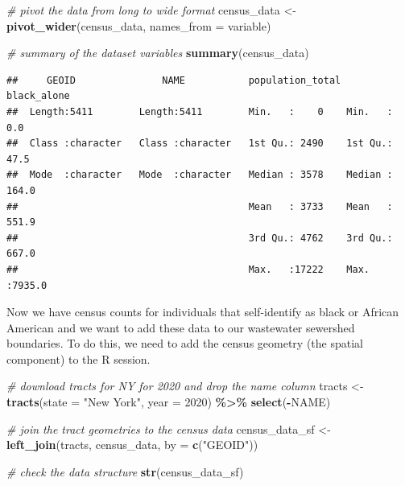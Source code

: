 \documentclass[
]{book}
\newenvironment{Shaded}{\begin{snugshade}}{\end{snugshade}}
\newcommand{\AttributeTok}[1]{\textcolor[rgb]{0.13,0.29,0.53}{#1}}
\newcommand{\CommentTok}[1]{\textcolor[rgb]{0.56,0.35,0.01}{\textit{#1}}}
\newcommand{\DecValTok}[1]{\textcolor[rgb]{0.00,0.00,0.81}{#1}}
\newcommand{\FunctionTok}[1]{\textcolor[rgb]{0.13,0.29,0.53}{\textbf{#1}}}
\newcommand{\NormalTok}[1]{#1}
\newcommand{\OtherTok}[1]{\textcolor[rgb]{0.56,0.35,0.01}{#1}}
\newcommand{\SpecialCharTok}[1]{\textcolor[rgb]{0.81,0.36,0.00}{\textbf{#1}}}
\newcommand{\StringTok}[1]{\textcolor[rgb]{0.31,0.60,0.02}{#1}}
\begin{document}
\begin{Shaded}
\begin{Highlighting}[]
\CommentTok{\# pivot the data from long to wide format}
\NormalTok{census\_data }\OtherTok{\textless{}{-}} \FunctionTok{pivot\_wider}\NormalTok{(census\_data,}
                           \AttributeTok{names\_from =}\NormalTok{ variable)}

\CommentTok{\# summary of the dataset variables}
\FunctionTok{summary}\NormalTok{(census\_data)}
\end{Highlighting}
\end{Shaded}

\begin{verbatim}
##     GEOID               NAME           population_total  black_alone    
##  Length:5411        Length:5411        Min.   :    0    Min.   :   0.0  
##  Class :character   Class :character   1st Qu.: 2490    1st Qu.:  47.5  
##  Mode  :character   Mode  :character   Median : 3578    Median : 164.0  
##                                        Mean   : 3733    Mean   : 551.9  
##                                        3rd Qu.: 4762    3rd Qu.: 667.0  
##                                        Max.   :17222    Max.   :7935.0
\end{verbatim}

Now we have census counts for individuals that self-identify as black or African American and we want to add these data to our wastewater sewershed boundaries. To do this, we need to add the census geometry (the spatial component) to the R session.

\begin{Shaded}
\begin{Highlighting}[]
\CommentTok{\# download tracts for NY for 2020 and drop the name column}
\NormalTok{tracts }\OtherTok{\textless{}{-}} \FunctionTok{tracts}\NormalTok{(}\AttributeTok{state =} \StringTok{"New York"}\NormalTok{, }\AttributeTok{year =} \DecValTok{2020}\NormalTok{) }\SpecialCharTok{\%\textgreater{}\%} \FunctionTok{select}\NormalTok{(}\SpecialCharTok{{-}}\NormalTok{NAME) }

\CommentTok{\# join the tract geometries to the census data}
\NormalTok{census\_data\_sf }\OtherTok{\textless{}{-}} \FunctionTok{left\_join}\NormalTok{(tracts, census\_data, }\AttributeTok{by =} \FunctionTok{c}\NormalTok{(}\StringTok{"GEOID"}\NormalTok{))}
\end{Highlighting}
\end{Shaded}

\begin{Shaded}
\begin{Highlighting}[]
\CommentTok{\# check the data structure}
\FunctionTok{str}\NormalTok{(census\_data\_sf)}
\end{Highlighting}
\end{Shaded}
\end{document}
